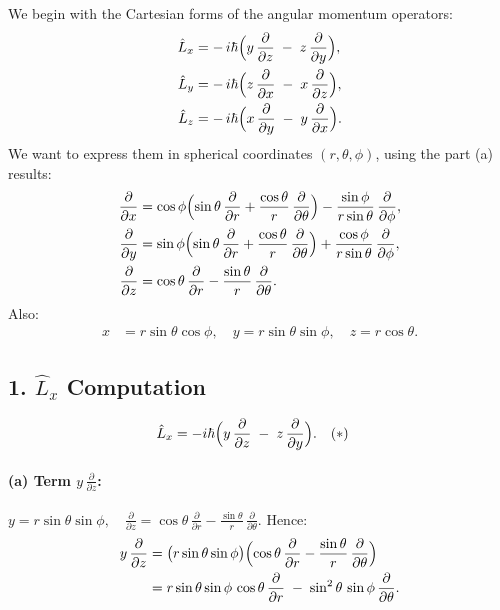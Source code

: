 \documentclass[12pt]{article}
\begin{document}
We begin with the Cartesian forms of the angular momentum operators:
\begin{align*}
\hat{L}_x &= -\,i\hbar \Bigl(y\,\frac{\partial}{\partial z} \;-\; z\,\frac{\partial}{\partial y}\Bigr),\\
\hat{L}_y &= -\,i\hbar \Bigl(z\,\frac{\partial}{\partial x} \;-\; x\,\frac{\partial}{\partial z}\Bigr),\\
\hat{L}_z &= -\,i\hbar \Bigl(x\,\frac{\partial}{\partial y} \;-\; y\,\frac{\partial}{\partial x}\Bigr).
\end{align*}
We want to express them in spherical coordinates \((r,\theta,\phi)\), using the part (a) results:
\begin{align*}
\frac{\partial}{\partial x} &= \cos\phi \Bigl(\sin\theta\,\frac{\partial}{\partial r} + \frac{\cos\theta}{r}\,\frac{\partial}{\partial \theta}\Bigr) - \frac{\sin\phi}{r\sin\theta}\,\frac{\partial}{\partial \phi},\\
\frac{\partial}{\partial y} &= \sin\phi \Bigl(\sin\theta\,\frac{\partial}{\partial r} + \frac{\cos\theta}{r}\,\frac{\partial}{\partial \theta}\Bigr) + \frac{\cos\phi}{r\sin\theta}\,\frac{\partial}{\partial \phi},\\
\frac{\partial}{\partial z} &= \cos\theta\,\frac{\partial}{\partial r} - \frac{\sin\theta}{r}\,\frac{\partial}{\partial \theta}.
\end{align*}
Also:
\begin{align*}
 x &= r\sin\theta\cos\phi,\quad y = r\sin\theta\sin\phi,\quad z=r\cos\theta.
\end{align*}

\subsection*{1. $\hat{L}_x$ Computation}
\begin{align*}
\hat{L}_x &= -i\hbar\Bigl(y\,\frac{\partial}{\partial z} \;-\; z\,\frac{\partial}{\partial y}\Bigr).\quad (\ast)
\end{align*}
\paragraph{(a) Term $y\,\frac{\partial}{\partial z}$:}
\(
 y = r\sin\theta\sin\phi,\quad \frac{\partial}{\partial z} = \cos\theta\,\frac{\partial}{\partial r} - \frac{\sin\theta}{r}\,\frac{\partial}{\partial \theta}.
\)
Hence:
\begin{align*}
 y\,\frac{\partial}{\partial z} &= \bigl(r\sin\theta\sin\phi\bigr)\Bigl(\cos\theta\,\frac{\partial}{\partial r} - \frac{\sin\theta}{r}\,\frac{\partial}{\partial \theta}\Bigr)\\
 &= r\sin\theta\sin\phi\,\cos\theta\,\frac{\partial}{\partial r}\; -\;\sin^2\theta\,\sin\phi\,\frac{\partial}{\partial \theta}.
\end{align*}
\end{document}
